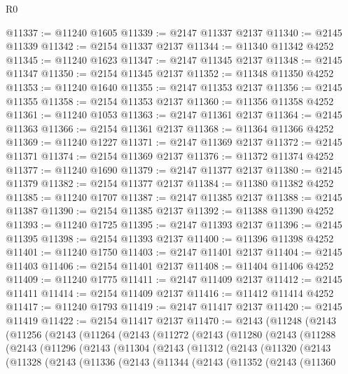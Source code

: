 \begin{lexlean}{R0}
\begin{coremodule}
@11337 := @11240 @1605
@11339 := @2147 @11337 @2137
@11340 := @2145 @11339
@11342 := @2154 @11337 @2137
@11344 := @11340 @11342 @4252
@11345 := @11240 @1623
@11347 := @2147 @11345 @2137
@11348 := @2145 @11347
@11350 := @2154 @11345 @2137
@11352 := @11348 @11350 @4252
@11353 := @11240 @1640
@11355 := @2147 @11353 @2137
@11356 := @2145 @11355
@11358 := @2154 @11353 @2137
@11360 := @11356 @11358 @4252
@11361 := @11240 @1053
@11363 := @2147 @11361 @2137
@11364 := @2145 @11363
@11366 := @2154 @11361 @2137
@11368 := @11364 @11366 @4252
@11369 := @11240 @1227
@11371 := @2147 @11369 @2137
@11372 := @2145 @11371
@11374 := @2154 @11369 @2137
@11376 := @11372 @11374 @4252
@11377 := @11240 @1690
@11379 := @2147 @11377 @2137
@11380 := @2145 @11379
@11382 := @2154 @11377 @2137
@11384 := @11380 @11382 @4252
@11385 := @11240 @1707
@11387 := @2147 @11385 @2137
@11388 := @2145 @11387
@11390 := @2154 @11385 @2137
@11392 := @11388 @11390 @4252
@11393 := @11240 @1725
@11395 := @2147 @11393 @2137
@11396 := @2145 @11395
@11398 := @2154 @11393 @2137
@11400 := @11396 @11398 @4252
@11401 := @11240 @1750
@11403 := @2147 @11401 @2137
@11404 := @2145 @11403
@11406 := @2154 @11401 @2137
@11408 := @11404 @11406 @4252
@11409 := @11240 @1775
@11411 := @2147 @11409 @2137
@11412 := @2145 @11411
@11414 := @2154 @11409 @2137
@11416 := @11412 @11414 @4252
@11417 := @11240 @1793
@11419 := @2147 @11417 @2137
@11420 := @2145 @11419
@11422 := @2154 @11417 @2137
@11470 := @2143
    (@11248
      (@2143
        (@11256
          (@2143
            (@11264
              (@2143
                (@11272
                  (@2143
                    (@11280
                      (@2143
                        (@11288
                          (@2143
                            (@11296
                              (@2143
                                (@11304
                                  (@2143
                                    (@11312
                                      (@2143
                                        (@11320
                                          (@2143
                                            (@11328
                                              (@2143
                                                (@11336
                                                  (@2143
                                                    (@11344
                                                      (@2143
                                                        (@11352
                                                          (@2143
                                                            (@11360

\end{coremodule}
\end{lexlean}
